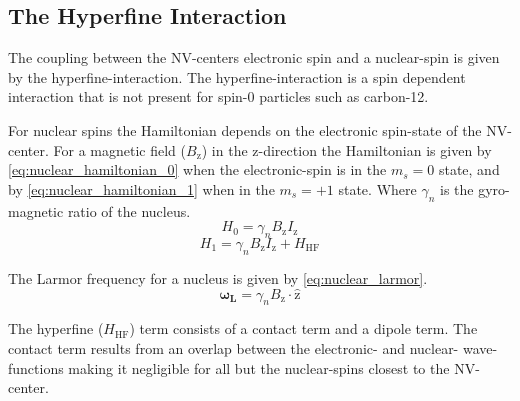 \subsection{The Hyperfine Interaction}
The coupling between the NV-centers electronic spin and a nuclear-spin is given by the hyperfine-interaction. The hyperfine-interaction is a spin dependent interaction that is not present for spin-0 particles such as carbon-12.

For nuclear spins the Hamiltonian depends on the electronic spin-state of the NV-center.
For a magnetic field ($B_\mathrm{z}$) in the z-direction the Hamiltonian is given by \cref{eq:nuclear_hamiltonian_0} when the electronic-spin is in the $m_s = 0$ state, and by \cref{eq:nuclear_hamiltonian_1} when in the $m_s = +1$ state\citep{Taminiau2014Universal}. Where $\gamma_n$ is the gyro-magnetic ratio of the nucleus.
 \begin{equation}
 \label{eq:nuclear_hamiltonian_0}
H_0= \gamma_{n} B_\mathrm{z} I_\mathrm{z}
\end{equation}
\begin{equation}
 \label{eq:nuclear_hamiltonian_1}
    H_1 = \gamma_{n} B_\mathrm{z} I_\mathrm{z} +H_{\mathrm{HF}}
\end{equation}

The Larmor frequency for a nucleus is given by  \cref{eq:nuclear_larmor}.
\begin{equation}
\label{eq:nuclear_larmor}
\bm{\omega_L} = \gamma_{n}B_\mathrm{z} \cdot\bm{\hat{\mathrm{z}}}
\end{equation}

The hyperfine ($H_{\mathrm{HF}}$) term consists of a contact term and a dipole term.
The contact term results from an overlap between the electronic- and nuclear- wave-functions making it negligible for all but the nuclear-spins closest to the NV-center.


